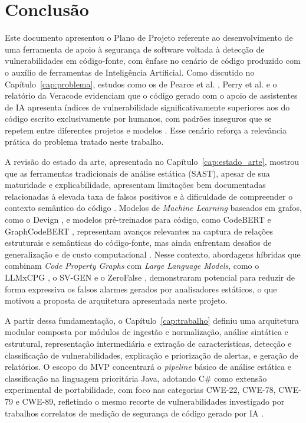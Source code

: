 \chapter{Conclusão}
\label{cap:conclusao}


Este documento apresentou o Plano de Projeto referente ao desenvolvimento
de uma ferramenta de apoio à segurança de software voltada à detecção de
vulnerabilidades em código-fonte, com ênfase no cenário de código
produzido com o auxílio de ferramentas de Inteligência Artificial. Como
discutido no Capítulo~\ref{cap:problema}, estudos como os de Pearce et
al. \cite{pearce2022copilot}, Perry et al. \cite{perry2023users} e o
relatório da Veracode \cite{veracode2025} evidenciam que o código gerado
com o apoio de assistentes de IA apresenta índices de vulnerabilidade
significativamente superiores aos do código escrito exclusivamente por
humanos, com padrões inseguros que se repetem entre diferentes projetos
e modelos \cite{wu2025,stateofcyber2026}. Esse cenário reforça a
relevância prática do problema tratado neste trabalho.

A revisão do estado da arte, apresentada no Capítulo~\ref{cap:estado_arte},
mostrou que as ferramentas tradicionais de análise estática (SAST),
apesar de sua maturidade e explicabilidade, apresentam limitações bem
documentadas relacionadas à elevada taxa de falsos positivos e à
dificuldade de compreender o contexto semântico do código
\cite{techscience2025,yang2025}. Modelos de \textit{Machine Learning}
baseados em grafos, como o Devign \cite{zhou2019devign}, e modelos
pré-treinados para código, como CodeBERT \cite{feng2020codebert} e
GraphCodeBERT \cite{guo2021graphcodebert}, representam avanços
relevantes na captura de relações estruturais e semânticas do
código-fonte, mas ainda enfrentam desafios de generalização e de custo
computacional \cite{chakraborty2021survey,ding2024primevul}. Nesse
contexto, abordagens híbridas que combinam \textit{Code Property Graphs}
\cite{yamaguchi2014cpg} com \textit{Large Language Models}, como o
LLMxCPG \cite{llmxcpg2025}, o SV-GEN \cite{svgen2026} e o ZeroFalse
\cite{yang2025}, demonstraram potencial para reduzir de forma expressiva
os falsos alarmes gerados por analisadores estáticos, o que motivou a
proposta de arquitetura apresentada neste projeto.

A partir dessa fundamentação, o Capítulo~\ref{cap:trabalho} definiu uma
arquitetura modular composta por módulos de ingestão e normalização,
análise sintática e estrutural, representação intermediária e extração
de características, detecção e classificação de vulnerabilidades,
explicação e priorização de alertas, e geração de relatórios. O escopo do MVP concentrará o \textit{pipeline} básico de análise estática e classificação na linguagem prioritária Java, adotando C\# como extensão experimental de portabilidade, com foco nas
categorias CWE-22, CWE-78, CWE-79 e CWE-89, refletindo o mesmo recorte
de vulnerabilidades investigado por trabalhos correlatos de medição de
segurança de código gerado por IA \cite{pearce2022copilot,wu2025}.

